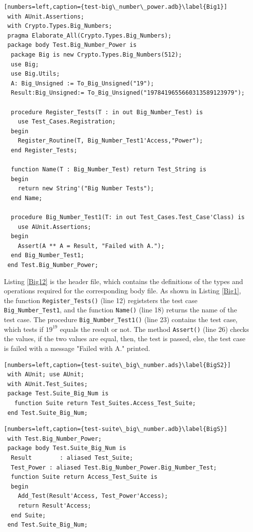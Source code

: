 \begin{lstlisting}[numbers=left,caption={test-big\_number\_power.adb}\label{Big1}]
 with AUnit.Assertions; 
 with Crypto.Types.Big_Numbers;
 pragma Elaborate_All(Crypto.Types.Big_Numbers);
 package body Test.Big_Number_Power is
  package Big is new Crypto.Types.Big_Numbers(512);
  use Big;
  use Big.Utils;
  A: Big_Unsigned := To_Big_Unsigned("19");
  Result:Big_Unsigned:= To_Big_Unsigned("1978419655660313589123979");
	
  procedure Register_Tests(T : in out Big_Number_Test) is
	use Test_Cases.Registration;
  begin
	Register_Routine(T, Big_Number_Test1'Access,"Power");
  end Register_Tests;

  function Name(T : Big_Number_Test) return Test_String is
  begin
	return new String'("Big Number Tests");
  end Name;

  procedure Big_Number_Test1(T: in out Test_Cases.Test_Case'Class) is
    use AUnit.Assertions; 
  begin
    Assert(A ** A = Result, "Failed with A.");
  end Big_Number_Test1;
 end Test.Big_Number_Power;
\end{lstlisting}

Listing \ref{Big12} is the header file, which contains the definitions
of the types and operations required for the corresponding body
file. As shown in Listing \ref{Big1}, the function
\texttt{Register\_Tests()} (line 12) registsters the test case
\texttt{Big\_Number\_Test1}, and the function \texttt{Name()} (line
18) returns the name of the test case. The procedure
\texttt{Big\_Number\_Test1()} (line 23) contains the test case, which
tests if $19^{19}$ equals the result or not. The method
\texttt{Assert()} (line 26) checks the values, if the two values are
equal, then, the test is passed, else, the test case is failed with a
message "Failed with A." printed.

\begin{lstlisting}[numbers=left,caption={test-suite\_big\_number.ads}\label{BigS2}]
 with AUnit; use AUnit;
 with AUnit.Test_Suites;
 package Test.Suite_Big_Num is
   function Suite return Test_Suites.Access_Test_Suite;
 end Test.Suite_Big_Num;
\end{lstlisting}

\begin{lstlisting}[numbers=left,caption={test-suite\_big\_number.adb}\label{BigS}]
 with Test.Big_Number_Power;
 package body Test.Suite_Big_Num is
  Result	    : aliased Test_Suite;
  Test_Power : aliased Test.Big_Number_Power.Big_Number_Test;  
  function Suite return Access_Test_Suite is
  begin
    Add_Test(Result'Access, Test_Power'Access);    
    return Result'Access;
  end Suite;
 end Test.Suite_Big_Num;
\end{lstlisting}

